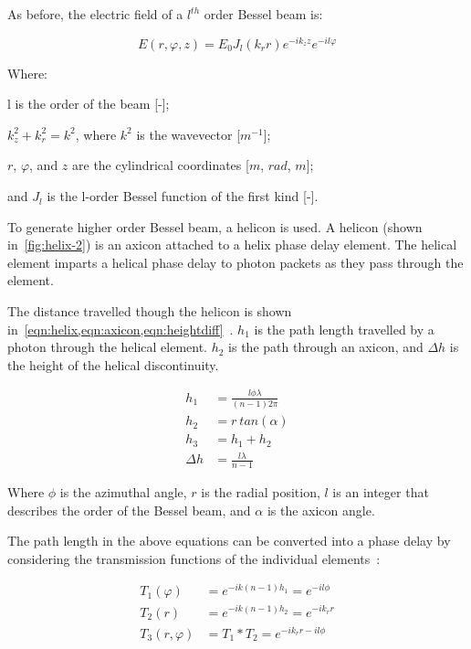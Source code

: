 As before, the electric field of a $l^{th}$ order Bessel beam is:

\begin{equation}
E(r,\varphi,z)=E_0J_l(k_r r)e^{-i k_z z}e^{-i l \varphi}
\label{eqn:hobb}
\end{equation}

\noindent Where:

\indent l is the order of the beam [-];

\indent $k_{z}^{2} + k_{r}^{2} =k^2$, where $k^2$ is the wavevector [$m^{-1}$];

\indent $r$, $\varphi$, and $z$ are the cylindrical coordinates [$m$, $rad$, $m$];

\indent and $J_l$ is the l-order Bessel function of the first kind [-].

\medskip


To generate higher order Bessel beam, a helicon is used.
A helicon (shown in~\cref{fig:helix-2}) is an axicon attached to a helix phase delay element.
The helical element imparts a helical phase delay to photon packets as they pass through the element.


The distance travelled though the helicon is shown in~\cref{eqn:helix,eqn:axicon,eqn:heightdiff}~\cite{wei2015generation}.
$h_1$ is the path length travelled by a photon through the helical element.
$h_2$ is the path through an axicon, and $\Delta h$ is the height of the helical discontinuity.

\begin{align}
h_1&=\frac{l\phi\lambda}{(n-1)2\pi} \label{eqn:helix}\\
h_2&=r\ tan(\alpha)\label{eqn:axicon}\\
h_3&=h_1+h_2 \label{eqn:helicon}\\
\Delta h &= \frac{l\lambda}{n-1}\label{eqn:heightdiff}
\end{align}

Where $\phi$ is the azimuthal angle, $r$ is the radial position, $l$ is an integer that describes the order of the Bessel beam, and $\alpha$ is the axicon angle.

The path length in the above equations can be converted into a phase delay by considering the transmission functions of the individual elements~\cite{khonina1992trochoson,kotlyar2006diffraction,topuzoski2009conversion,qiong2012generalization}:


\begin{align}
T_1(\varphi)&=e^{-ik(n-1)h_1}=e^{-il\phi}\\
T_2(r)&=e^{-ik(n-1)h_2}=e^{-ik_rr}\\
T_3(r,\varphi)&=T_1*T_2=e^{-ik_rr-il\phi}\\
\end{align}

